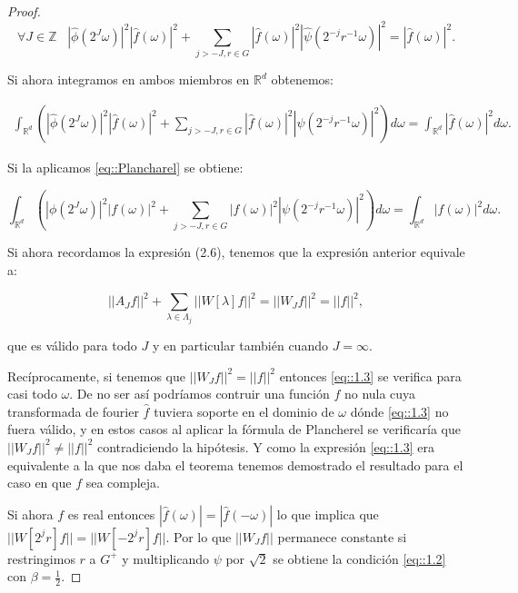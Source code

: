 \begin{proof}
$$\forall J \in \mathbb{Z} \; \; \; \left|\widehat{\phi}\left(2^J\omega\right)\right|^2 \left|\widehat{f}(\omega)\right|^2 + \sum_{j>-J,r\in G}\left|\widehat{f}(\omega)\right|^2\left|\widehat{\psi}\left(2^{-j}r^{-1}\omega\right)\right|^2=\left|\widehat{f}(\omega)\right|^2.$$

\noindent Si ahora integramos en ambos miembros en $\mathbb{R}^d$ obtenemos: 

     \begin{align*}
        \int_{\mathbb{R}^d}\left(\left|\widehat{\phi}\left(2^J\omega\right)\right|^2 \left|\widehat{f}(\omega)\right|^2 + \sum_{j>-J,r\in G}\left|\widehat{f}(\omega)\right|^2\left|\widehat{\psi}\left(2^{-j}r^{-1}\omega\right)\right|^2 \right) d\omega=\int_{\mathbb{R}^d}\left|\widehat{f}(\omega)\right|^2 d\omega.
    \end{align*}

\noindent Si la aplicamos \eqref{eq::Plancharel} se obtiene:

$$\int_{\mathbb{R}^d}\left(\left|\phi\left(2^J\omega\right)\right|^2 \left|f(\omega)\right|^2 + \sum_{j>-J,r\in G}\left|f(\omega)\right|^2\left|\psi\left(2^{-j}r^{-1}\omega\right)\right|^2 \right) d\omega=\int_{\mathbb{R}^d}\left|f(\omega)\right|^2 d\omega.$$

\noindent Si ahora recordamos la expresión (2.6), tenemos que la expresión anterior equivale a:

$$||A_Jf||^2+\sum_{\lambda \in \Lambda_j} ||W[\lambda]f||^2=||W_J f||^2=||f||^2,$$

\noindent que es válido para todo $J$ y en particular también cuando $J=\infty$.

\medskip

\noindent Recíprocamente, si tenemos que $||W_J f||^2=||f||^2$ entonces \eqref{eq::1.3} se verifica para casi todo $\omega$. De no ser así podríamos contruir una función $f$ no nula cuya transformada de fourier $\widehat{f}$ tuviera soporte en el dominio de $\omega$ dónde \eqref{eq::1.3} no fuera válido, y en estos casos al aplicar la fórmula de Plancherel se verificaría que $||W_J f||^2 \neq ||f||^2$ contradiciendo la hipótesis. Y como la expresión \eqref{eq::1.3} era equivalente a la que nos daba el teorema tenemos demostrado el resultado para el caso en que $f$ sea compleja. 

\medskip

\noindent Si ahora $f$ es real entonces $|\widehat{f}(\omega)|=|\widehat{f}(-\omega)|$ lo que implica que $||W[2^jr]f||=||W[-2^jr]f||$. Por lo que $||W_J f||$ permanece constante si restringimos $r$ a $G^+$ y multiplicando $\psi$ por $\sqrt{2}$ se obtiene la condición \eqref{eq::1.2} con $\beta=\frac{1}{2}$. \qedhere

\end{proof}

